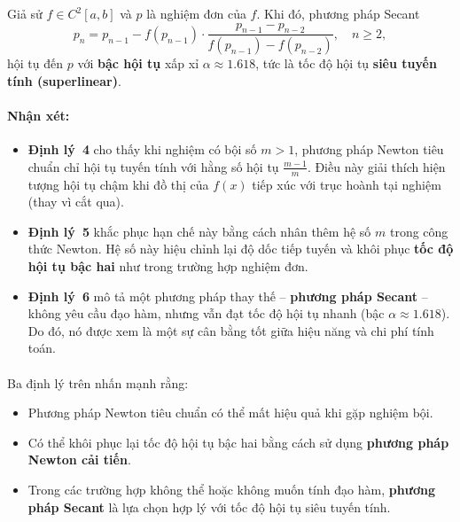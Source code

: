 \begin{theorem}
Giả sử $f \in C^{2}[a,b]$ và $p$ là nghiệm đơn của $f$. 
Khi đó, phương pháp Secant 
\[
    p_{n} = p_{n-1} - f(p_{n-1}) \cdot 
    \frac{p_{n-1} - p_{n-2}}{f(p_{n-1}) - f(p_{n-2})}, \quad n \ge 2,
\]
hội tụ đến $p$ với \textbf{bậc hội tụ} xấp xỉ $\alpha \approx 1.618$, 
tức là tốc độ hội tụ \textbf{siêu tuyến tính (superlinear)}.
\end{theorem}

\paragraph*{Nhận xét:}
\begin{itemize}
    \item \textbf{Định lý~4} cho thấy khi nghiệm có bội số $m > 1$, 
    phương pháp Newton tiêu chuẩn chỉ hội tụ tuyến tính với hằng số hội tụ $\tfrac{m-1}{m}$.  
    Điều này giải thích hiện tượng hội tụ chậm khi đồ thị của $f(x)$ 
    tiếp xúc với trục hoành tại nghiệm (thay vì cắt qua).

    \item \textbf{Định lý~5} khắc phục hạn chế này bằng cách 
    nhân thêm hệ số $m$ trong công thức Newton.  
    Hệ số này hiệu chỉnh lại độ dốc tiếp tuyến và 
    khôi phục \textbf{tốc độ hội tụ bậc hai} như trong trường hợp nghiệm đơn.

    \item \textbf{Định lý~6} mô tả một phương pháp thay thế – 
    \textbf{phương pháp Secant} – 
    không yêu cầu đạo hàm, nhưng vẫn đạt tốc độ hội tụ nhanh 
    (bậc $\alpha \approx 1.618$).  
    Do đó, nó được xem là một sự cân bằng tốt giữa hiệu năng và chi phí tính toán.
\end{itemize}

\paragraph*{}
Ba định lý trên nhấn mạnh rằng:
\begin{itemize}
    \item Phương pháp Newton tiêu chuẩn có thể mất hiệu quả khi gặp nghiệm bội.
    \item Có thể khôi phục lại tốc độ hội tụ bậc hai 
    bằng cách sử dụng \textbf{phương pháp Newton cải tiến}.
    \item Trong các trường hợp không thể hoặc không muốn tính đạo hàm, 
    \textbf{phương pháp Secant} là lựa chọn hợp lý với tốc độ hội tụ siêu tuyến tính.
\end{itemize}
